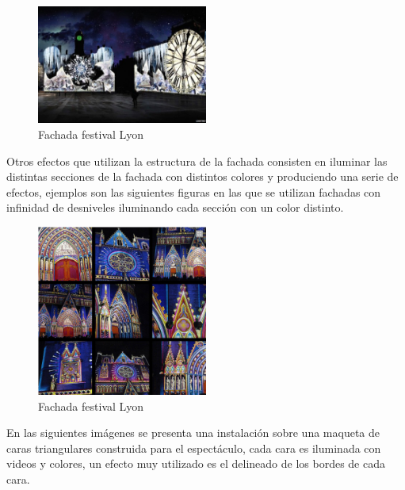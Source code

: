 \begin{figure}[H]
  \centering
    \includegraphics[width=0.5\textwidth]{./Cap1_intro/Fachada3.jpg}
  \caption[http://www.weltlighting.com/]{Fachada festival Lyon}
  \label{fig:Fachada}
\end{figure}

Otros efectos que utilizan la estructura de la fachada consisten en iluminar las distintas secciones de la fachada con distintos colores y produciendo una serie de efectos, ejemplos son las siguientes figuras en las que se utilizan fachadas con infinidad de desniveles iluminando cada sección con un color distinto.
\begin{figure}[H]
  \centering
    \includegraphics[width=0.5\textwidth]{./Cap1_intro/Fachada1.png}
  \caption[http://www.weltlighting.com/]{Fachada festival Lyon}
  \label{fig:Fachada1}
\end{figure}

En las siguientes imágenes se presenta una instalación sobre una maqueta de caras triangulares construida para el espectáculo, cada cara es iluminada con videos y colores, un efecto muy utilizado es el delineado de los bordes de cada cara.

